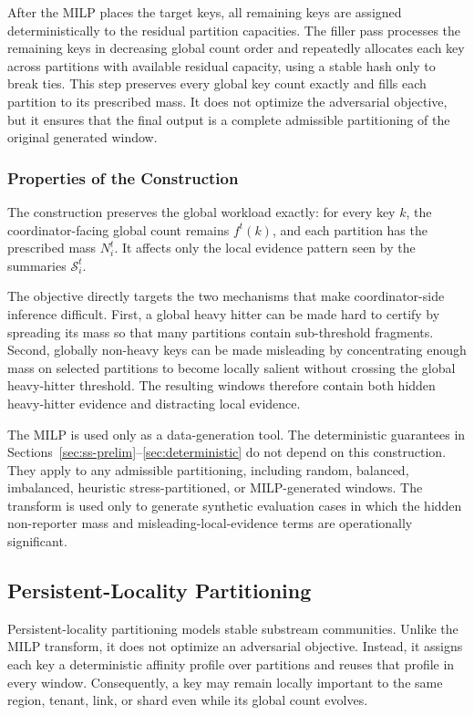 \documentclass[sigconf, nonacm]{acmart}
\begin{document}
After the MILP places the target keys, all remaining keys are assigned deterministically to the residual partition capacities. The filler pass processes the remaining keys in decreasing global count order and repeatedly allocates each key across partitions with available residual capacity, using a stable hash only to break ties. This step preserves every global key count exactly and fills each partition to its prescribed mass. It does not optimize the adversarial objective, but it ensures that the final output is a complete admissible partitioning of the original generated window.

\subsubsection{Properties of the Construction}

The construction preserves the global workload exactly: for every key \(k\), the coordinator-facing global count remains \(f^t(k)\), and each partition has the prescribed mass \(N_i^t\). It affects only the local evidence pattern seen by the summaries \(\mathcal S_i^t\).

The objective directly targets the two mechanisms that make coordinator-side inference difficult. First, a global heavy hitter can be made hard to certify by spreading its mass so that many partitions contain sub-threshold fragments. Second, globally non-heavy keys can be made misleading by concentrating enough mass on selected partitions to become locally salient without crossing the global heavy-hitter threshold. The resulting windows therefore contain both hidden heavy-hitter evidence and distracting local evidence.

The MILP is used only as a data-generation tool. The deterministic guarantees in Sections~\ref{sec:ss-prelim}--\ref{sec:deterministic} do not depend on this construction. They apply to any admissible partitioning, including random, balanced, imbalanced, heuristic stress-partitioned, or MILP-generated windows. The transform is used only to generate synthetic evaluation cases in which the hidden non-reporter mass and misleading-local-evidence terms are operationally significant.

\subsection{Persistent-Locality Partitioning}
\label{app:persistent-locality}

Persistent-locality partitioning models stable substream communities. Unlike
the MILP transform, it does not optimize an adversarial objective. Instead, it
assigns each key a deterministic affinity profile over partitions and reuses
that profile in every window. Consequently, a key may remain locally important
to the same region, tenant, link, or shard even while its global count evolves.
\end{document}
